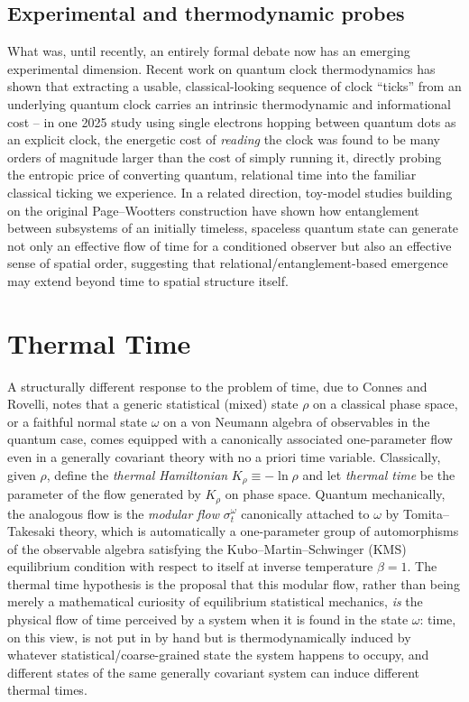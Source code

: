 \documentclass[11pt]{article}
\begin{document}
\subsection{Experimental and thermodynamic probes}

What was, until recently, an entirely formal debate now has an emerging experimental dimension. Recent work on quantum clock thermodynamics has shown that extracting a usable, classical-looking sequence of clock ``ticks'' from an underlying quantum clock carries an intrinsic thermodynamic and informational cost -- in one 2025 study using single electrons hopping between quantum dots as an explicit clock, the energetic cost of \emph{reading} the clock was found to be many orders of magnitude larger than the cost of simply running it, directly probing the entropic price of converting quantum, relational time into the familiar classical ticking we experience. In a related direction, toy-model studies building on the original Page--Wootters construction have shown how entanglement between subsystems of an initially timeless, spaceless quantum state can generate not only an effective flow of time for a conditioned observer but also an effective sense of spatial order, suggesting that relational/entanglement-based emergence may extend beyond time to spatial structure itself.

\section{Thermal Time}
\label{sec:thermal}

A structurally different response to the problem of time, due to Connes and Rovelli, notes that a generic statistical (mixed) state $\rho$ on a classical phase space, or a faithful normal state $\omega$ on a von Neumann algebra of observables in the quantum case, comes equipped with a canonically associated one-parameter flow even in a generally covariant theory with no a priori time variable. Classically, given $\rho$, define the \emph{thermal Hamiltonian} $K_\rho \equiv -\ln\rho$ and let \emph{thermal time} be the parameter of the flow generated by $K_\rho$ on phase space. Quantum mechanically, the analogous flow is the \emph{modular flow} $\sigma^\omega_t$ canonically attached to $\omega$ by Tomita--Takesaki theory, which is automatically a one-parameter group of automorphisms of the observable algebra satisfying the Kubo--Martin--Schwinger (KMS) equilibrium condition with respect to itself at inverse temperature $\beta=1$. The thermal time hypothesis is the proposal that this modular flow, rather than being merely a mathematical curiosity of equilibrium statistical mechanics, \emph{is} the physical flow of time perceived by a system when it is found in the state $\omega$: time, on this view, is not put in by hand but is thermodynamically induced by whatever statistical/coarse-grained state the system happens to occupy, and different states of the same generally covariant system can induce different thermal times.
\end{document}
